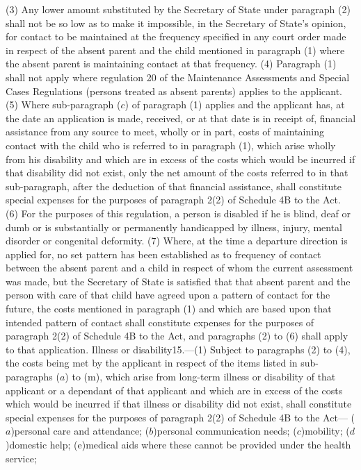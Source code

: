 \documentclass[a4paper]{article}
\begin{document}
(3) Any lower amount substituted by the Secretary of State under paragraph (2)
shall not be so low as to make it impossible, in the Secretary of State’s
opinion, for contact to be maintained at the frequency specified in any court
order made in respect of the absent parent and the child mentioned in paragraph
(1) where the absent parent is maintaining contact at that frequency.
(4) Paragraph (1) shall not apply where regulation 20 of the Maintenance
Assessments and Special Cases Regulations (persons treated as absent parents)
applies to the applicant.
(5) Where sub-paragraph ($c$) of paragraph (1) applies and the applicant has, at
the date an application is made, received, or at that date is in receipt of,
financial assistance from any source to meet, wholly or in part, costs of
maintaining contact with the child who is referred to in paragraph (1), which
arise wholly from his disability and which are in excess of the costs which
would be incurred if that disability did not exist, only the net amount of the
costs referred to in that sub-paragraph, after the deduction of that financial
assistance, shall constitute special expenses for the purposes of paragraph 2(2)
of Schedule 4B to the Act.
(6) For the purposes of this regulation, a person is disabled if he is blind,
deaf or dumb or is substantially or permanently handicapped by illness, injury,
mental disorder or congenital deformity.
(7) Where, at the time a departure direction is applied for, no set pattern has
been established as to frequency of contact between the absent parent and a
child in respect of whom the current assessment was made, but the Secretary of
State is satisfied that that absent parent and the person with care of that
child have agreed upon a pattern of contact for the future, the costs mentioned
in paragraph (1) and which are based upon that intended pattern of contact shall
constitute expenses for the purposes of paragraph 2(2) of Schedule 4B to the
Act, and paragraphs (2) to (6) shall apply to that application.
Illness or disability15.—(1) Subject to paragraphs (2) to (4), the costs being
met by the applicant in respect of the items listed in sub-paragraphs ($a$) to
(m), which arise from long-term illness or disability of that applicant or a
dependant of that applicant and which are in excess of the costs which would be
incurred if that illness or disability did not exist, shall constitute special
expenses for the purposes of paragraph 2(2) of Schedule 4B to the Act—
($a$)personal care and attendance;
($b$)personal communication needs;
($c$)mobility;
($d$)domestic help;
(e)medical aids where these cannot be provided under the health service;
\end{document}
